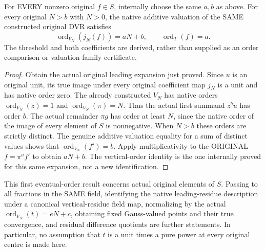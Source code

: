 \begin{theorem}
\label{thm:gauss-surface-original-eventual-orders}
\leanok
For EVERY nonzero original $f\in S$, internally choose the same $a,b$ as
above. For every original $N>b$ with $N>0$, the native additive valuation of
the SAME constructed original DVR satisfies
\[
 \operatorname{ord}_{V_N}(j_N(f))=aN+b,
 \qquad \operatorname{ord}_T(f)=a.
\]
The threshold and both coefficients are derived, rather than supplied as
an order comparison or valuation-family certificate.
\end{theorem}
\begin{proof}
Obtain the actual original leading expansion just proved. Since $u$ is an
original unit, its true image under every original coefficient map $j_N$ is
a unit and has native order zero. The already constructed $V_N$ has native
orders $\operatorname{ord}_{V_N}(z)=1$ and
$\operatorname{ord}_{V_N}(\pi)=N$. Thus the actual first summand $z^bu$ has
order $b$. The actual remainder $\pi g$ has order at least $N$, since the
native order of the image of every element of $S$ is nonnegative.
When $N>b$ these orders are strictly distinct. The genuine additive
valuation equality for a sum of distinct values shows that
$\operatorname{ord}_{V_N}(f')=b$. Apply multiplicativity to
the ORIGINAL $f=\pi^af'$ to obtain $aN+b$. The vertical-order identity is
the one internally proved for this same expansion, not a new identification.
\end{proof}

This first eventual-order result concerns actual original elements of
$S$. Passing to all fractions in the SAME field, identifying the native
leading-residue description under a canonical vertical-residue field map,
normalizing by the actual $\operatorname{ord}_{V_N}(t)=eN+c$, obtaining fixed
Gauss-valued points and their true convergence, and residual difference
quotients are further statements. In particular, no assumption that
$t$ is a unit times a pure power at every original centre is made here.
